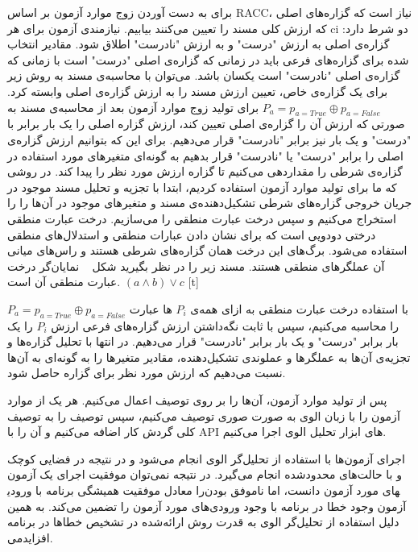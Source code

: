 برای به دست آوردن زوج موارد آزمون بر اساس RACC، نیاز است که گزاره‌های اصلی که ارزش کلی مسند را تعیین می‌کنند بیابیم. نیازمندی آزمون برای هر ci دو شرط دارد: گزاره‌ی اصلی به ارزش "درست" و به ارزش "نادرست" اطلاق شود. مقادیر انتخاب شده برای گزاره‌های فرعی باید در زمانی که گزاره‌ی اصلی "درست" است با زمانی که گزاره‌ی اصلی  "نادرست" است یکسان باشد.
می‌توان با محاسبه‌ی مسند به روش زیر برای یک گزاره‌ی خاص، تعیین ارزش مسند را به ارزش گزاره‌ی اصلی وابسته کرد. 
$P_a = p_{a=True}\oplus p_{a=False}$
برای تولید زوج موارد آزمون بعد از محاسبه‌ی مسند به صورتی که ارزش آن را گزاره‌ی اصلی تعیین کند، ارزش گزاره اصلی را یک بار برابر با "درست" و یک بار نیز برابر "نادرست" قرار می‌دهیم. برای این که بتوانیم ارزش گزاره‌ی اصلی را برابر "درست" یا "نادرست" قرار بدهیم به گونه‌ای متغیر‌های مورد استفاده در گزاره‌ی شرطی را مقداردهی می‌کنیم تا گزاره ارزش مورد نظر را پیدا کند.
در روشی که ما برای تولید موارد آزمون استفاده کردیم، ابتدا با تجزیه و تحلیل مسند موجود در جریان خروجی گزاره‌های شرطی تشکیل‌دهنده‌ی مسند و متغیرهای موجود در آن‌ها را را استخراج می‌کنیم و  سپس درخت عبارت منطقی را می‌سازیم. درخت عبارت منطقی درختی دودویی است که برای نشان دادن عبارات منطقی و استدلال‌های منطقی استفاده می‌شود. برگ‌های این درخت همان گزاره‌های شرطی هستند و راس‌های میانی آن عملگرهای منطقی هستند. مسند زیر را در نظر بگیرید شکل ~ نمایان‌گر درخت عبارت منطقی آن است.
$(a \wedge b) \vee c$
[t]
\vspace{0.5em}

با استفاده درخت عبارت منطقی به ازای همه‌ی $P_i$ ها عبارت 
$P_a = p_{a=True}\oplus p_{a=False}$
را محاسبه می‌کنیم، سپس با ثابت نگه‌داشتن ارزش گزاره‌های فرعی ارزش $P_i$ را یک بار برابر "درست" و یک بار برابر "نادرست" قرار می‌دهیم. در انتها با تحلیل گزاره‌ها و تجزیه‌ی آن‌ها به عملگرها و عملوندی تشکیل‌دهنده، مقادیر متغیرها را به گونه‌ای به آن‌ها نسبت می‌دهیم که ارزش مورد نظر برای گزاره حاصل شود.

پس از تولید موارد آزمون، آن‌ها را بر روی توصیف اعمال می‌کنیم. هر یک از موارد آزمون را با زبان الوی به صورت صوری توصیف می‌کنیم، سپس توصیف را به توصیف کلی گردش کار اضافه می‌کنیم و آن را با API های ابزار تحلیل الوی اجرا می‌کنیم. 

اجرای آزمون‌ها با استفاده از تحلیل‌گر الوی انجام می‌شود و در نتیجه در فضایی کوچک و با حالت‌های محدود‌شده انجام می‌گیرد. در نتیجه نمی‌توان موفقیت اجرای یک آزمون را معادل موفقیت همیشگی برنامه با ورودی‎های مورد آزمون دانست، اما ناموفق بودن آزمون وجود خطا در برنامه با وجود ورودی‌های مورد آزمون را تضمین می‌کند. به همین دلیل استفاده از تحلیل‌گر الوی به قدرت روش ارائه‌شده در تشخیص خطاها در برنامه می‎‌افزاید.

